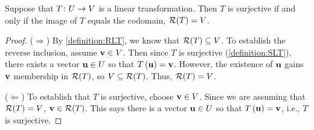 \documentclass{ximera}
\begin{document}
\begin{theorem}
\label{theorem:RSLT}


Suppose that $T\colon U\rightarrow V$ is a linear transformation.  Then $T$ is surjective if and only if the image of $T$ equals the codomain, $\mathcal{R}\!\left(T\right)=V$.


\begin{proof}
($\Rightarrow$) By \ref{definition:RLT}, we know that $\mathcal{R}\!\left(T\right)\subseteq V$.  To establish the reverse inclusion, assume $\mathbf{v}\in V$.  Then since $T$ is surjective (\ref{definition:SLT}), there exists a vector $\mathbf{u}\in U$ so that $T\left(\mathbf{u}\right)=\mathbf{v}$.  However, the existence of $\mathbf{u}$ gains $\mathbf{v}$ membership in $\mathcal{R}\!\left(T\right)$, so $V\subseteq\mathcal{R}\!\left(T\right)$.  Thus, $\mathcal{R}\!\left(T\right)=V$.



($\Leftarrow$)  To establish that $T$ is surjective, choose $\mathbf{v}\in V$.  Since we are assuming that $\mathcal{R}\!\left(T\right)=V$, $\mathbf{v}\in\mathcal{R}\!\left(T\right)$.  This says there is a vector $\mathbf{u}\in U$ so that $T\left(\mathbf{u}\right)=\mathbf{v}$, i.e.,  $T$ is surjective.



\end{proof}
\end{theorem}
\end{document}
